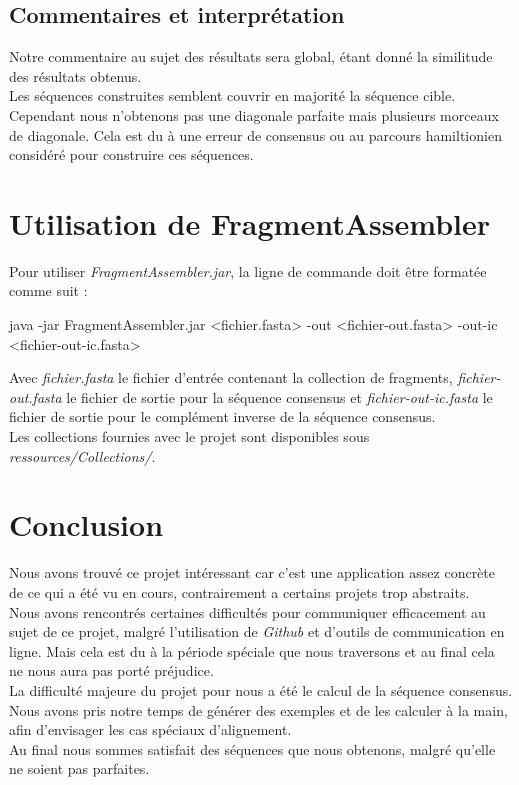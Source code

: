 \documentclass[11pt]{article}
\begin{document}
\subsection*{Commentaires et interprétation}
Notre commentaire au sujet des résultats sera global, étant donné la similitude des résultats obtenus.\\
Les séquences construites semblent couvrir en majorité la séquence cible. Cependant nous n'obtenons pas une diagonale parfaite mais plusieurs morceaux de diagonale. Cela est du à une erreur de consensus ou au parcours hamiltionien considéré pour construire ces séquences.
\section{Utilisation de FragmentAssembler}
Pour utiliser \emph{FragmentAssembler.jar}, la ligne de commande doit être formatée comme suit :
\begin{center}
java -jar FragmentAssembler.jar <fichier.fasta> -out <fichier-out.fasta> -out-ic <fichier-out-ic.fasta>
\end{center}
Avec \emph{fichier.fasta} le fichier d'entrée contenant la collection de fragments, \emph{fichier-out.fasta} le fichier de sortie pour la séquence consensus et \emph{fichier-out-ic.fasta} le fichier de sortie pour le complément inverse de la séquence consensus.\\
Les collections fournies avec le projet sont disponibles sous \emph{ressources/Collections/}.
\section{Conclusion}
Nous avons trouvé ce projet intéressant car c'est une application assez concrète de ce qui a été vu en cours, contrairement a certains projets trop abstraits.\\
Nous avons rencontrés certaines difficultés pour communiquer efficacement au sujet de ce projet, malgré l'utilisation de \emph{Github} et d'outils de communication en ligne. Mais cela est du à la période spéciale que nous traversons et au final cela ne nous aura pas porté préjudice.\\
La difficulté majeure du projet pour nous a été le calcul de la séquence consensus. Nous avons pris notre temps de générer des exemples et de les calculer à la main, afin d'envisager les cas spéciaux d'alignement.\\
Au final nous sommes satisfait des séquences que nous obtenons, malgré qu'elle ne soient pas parfaites.\\
\end{document}
